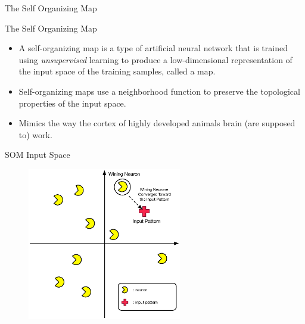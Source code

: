 \begin{frame}{The Self Organizing Map}
  \begin{block}{The Self Organizing Map}
    \begin{itemize}
      \item  A self-organizing map is a type of artificial neural network that is trained using \textit{ unsupervised } learning to produce a low-dimensional representation of the input space of the training samples, called a map. 
        \item Self-organizing maps use a neighborhood function to preserve the topological properties of the input space.
        \item Mimics the way the cortex of highly developed animals brain (are supposed to) work.
    \end{itemize}
  \end{block}
\end{frame}

\begin{frame}{SOM Input Space}
  \begin{figure}
    \centering
    \includegraphics[width=0.6\textwidth]{images/1_wining_neuron_converge.eps}
    \label{fig:MeasurementCatPriority}
  \end{figure}
\end{frame}

